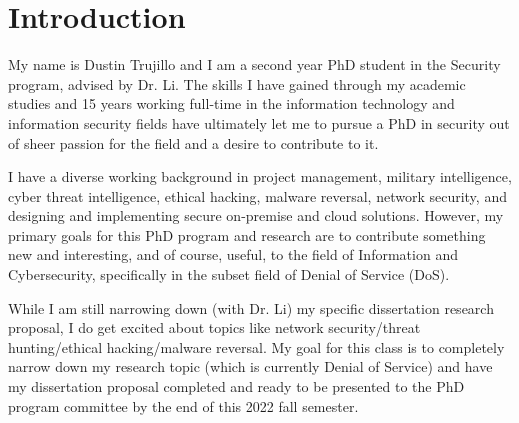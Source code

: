 






\section{Introduction}

My name is Dustin Trujillo and I am a second year PhD student in the Security program, advised by Dr. Li. The skills I have gained through my academic studies and 15 years working full-time in the information technology and information security fields have ultimately let me to pursue a PhD in security out of sheer passion for the field and a desire to contribute to it.

I have a diverse working background in project management, military intelligence, cyber threat intelligence, ethical hacking, malware reversal, network security, and designing and implementing secure on-premise and cloud solutions. However, my primary goals for this PhD program and research are to contribute something new and interesting, and of course, useful, to the field of Information and Cybersecurity, specifically in the subset field of Denial of Service (DoS).

While I am still narrowing down (with Dr. Li) my specific dissertation research proposal, I do get excited about topics like network security/threat hunting/ethical hacking/malware reversal. My goal for this class is to completely narrow down my research topic (which is currently Denial of Service) and have my dissertation proposal completed and ready to be presented to the PhD program committee by the end of this 2022 fall semester.

